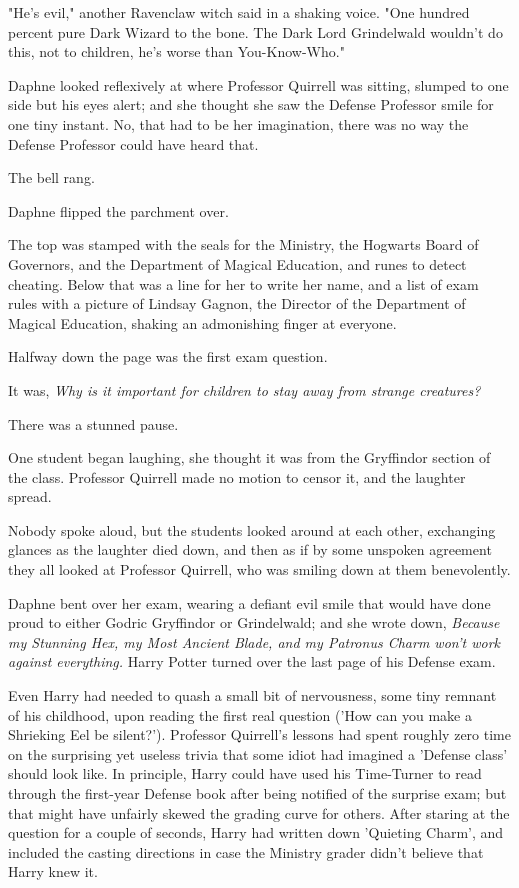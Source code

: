 "He's evil," another Ravenclaw witch said in a shaking voice. "One hundred percent pure Dark Wizard to the bone. The Dark Lord Grindelwald wouldn't do this, not to children, he's worse than You-Know-Who."

Daphne looked reflexively at where Professor Quirrell was sitting, slumped to one side but his eyes alert; and she thought she saw the Defense Professor smile for one tiny instant. No, that had to be her imagination, there was no way the Defense Professor could have heard that.

The bell rang.

Daphne flipped the parchment over.

The top was stamped with the seals for the Ministry, the Hogwarts Board of Governors, and the Department of Magical Education, and runes to detect cheating. Below that was a line for her to write her name, and a list of exam rules with a picture of Lindsay Gagnon, the Director of the Department of Magical Education, shaking an admonishing finger at everyone.

Halfway down the page was the first exam question.

It was, \emph{Why is it important for children to stay away from strange creatures?}

There was a stunned pause.

One student began laughing, she thought it was from the Gryffindor section of the class. Professor Quirrell made no motion to censor it, and the laughter spread.

Nobody spoke aloud, but the students looked around at each other, exchanging glances as the laughter died down, and then as if by some unspoken agreement they all looked at Professor Quirrell, who was smiling down at them benevolently.

Daphne bent over her exam, wearing a defiant evil smile that would have done proud to either Godric Gryffindor or Grindelwald; and she wrote down, \emph{Because my Stunning Hex, my Most Ancient Blade, and my Patronus Charm won't work against everything.}
\sbreak
Harry Potter turned over the last page of his Defense exam.

Even Harry had needed to quash a small bit of nervousness, some tiny remnant of his childhood, upon reading the first real question ('How can you make a Shrieking Eel be silent?'). Professor Quirrell's lessons had spent roughly zero time on the surprising yet useless trivia that some idiot had imagined a 'Defense class' should look like. In principle, Harry could have used his Time-Turner to read through the first-year Defense book after being notified of the surprise exam; but that might have unfairly skewed the grading curve for others. After staring at the question for a couple of seconds, Harry had written down 'Quieting Charm', and included the casting directions in case the Ministry grader didn't believe that Harry knew it.


